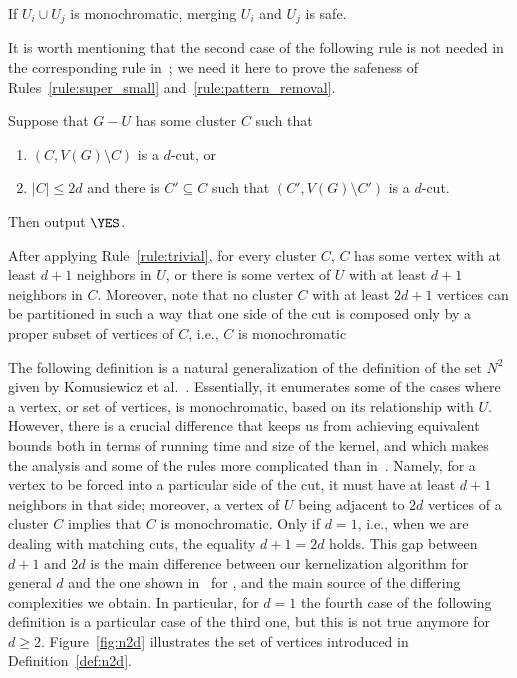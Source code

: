 \begin{observation}
    If $U_i \cup U_j$ is monochromatic, merging $U_i$ and $U_j$ is safe.
\end{observation}


It is worth mentioning that the second case of the following rule is not needed in the corresponding rule in~\cite{matching_cut_ipec}; we need it here to prove the safeness of Rules~\ref{rule:super_small} and~\ref{rule:pattern_removal}.

\begin{rrule}
    \label{rule:trivial}
    Suppose that $G - U$ has some cluster $C$ such that
    \begin{enumerate}
        \item $(C, V(G) \setminus C)$ is a $d$-cut, or
        \item $|C| \leq 2d$ and there is $C' \subseteq C$ such that $(C', V(G) \setminus C')$ is a $d$-cut.
    \end{enumerate}
    Then output $\YES$.
\end{rrule}

After applying Rule~\ref{rule:trivial}, for every cluster $C$, $C$  has some vertex with at least $d+1$ neighbors in $U$, or there is some vertex of $U$ with at least $d+1$ neighbors in $C$.
Moreover, note that no cluster $C$ with at least $2d+1$ vertices can be partitioned in such a way that one side of the cut is composed only by a proper subset of vertices of $C$, i.e., $C$ is monochromatic

The following definition is a natural generalization of the definition of the set $N^2$ given by Komusiewicz et al.~\cite{matching_cut_ipec}.
Essentially, it enumerates some of the cases where a vertex, or set of vertices, is monochromatic, based on its relationship with $U$.
However, there is a crucial difference that keeps us from achieving equivalent bounds both in terms of running time and size of the kernel, and which makes the analysis and some of the rules more complicated than in~\cite{matching_cut_ipec}.
Namely, for a vertex to be forced into a particular side of the cut, it must have at least $d+1$ neighbors in that side; moreover, a vertex of $U$ being adjacent to $2d$ vertices of a cluster $C$ implies that $C$ is monochromatic.
Only if $d=1$, i.e., when we are dealing with matching cuts, the equality $d+1 = 2d$ holds.
This gap between $d+1$ and $2d$ is the main difference between our kernelization algorithm for general $d$ and the one shown in~\cite{matching_cut_ipec} for , and the main source of the differing complexities we obtain. In particular, for $d=1$ the fourth case of the following definition is a particular case of the third one, but this is not true anymore for $d \geq 2$.
Figure~\ref{fig:n2d} illustrates the set of vertices introduced in Definition~\ref{def:n2d}.

